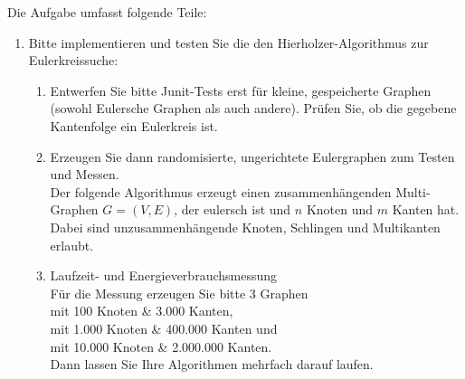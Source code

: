 \documentclass{article}
\begin{document}
		
Die Aufgabe umfasst folgende Teile:
			\begin{enumerate}
				\item Bitte implementieren und testen  Sie die den Hierholzer-Algorithmus zur Eulerkreissuche: 
				   \begin{enumerate}
								\item Entwerfen Sie bitte Junit-Tests erst für kleine, gespeicherte Graphen
								   (sowohl Eulersche Graphen als auch andere). 
									 Prüfen  Sie, ob die gegebene Kantenfolge ein Eulerkreis ist.							
								\item Erzeugen Sie dann randomisierte, ungerichtete  Eulergraphen zum Testen und Messen.\\
												
			Der folgende Algorithmus erzeugt einen zusammenhängenden Multi-Graphen $G=(V,E)$, der eulersch ist und $n$ Knoten und $m$ Kanten hat. Dabei sind unzusammenhängende Knoten, Schlingen und Multikanten erlaubt.\\[3mm]

							
\newpage

       \item Laufzeit- und Energieverbrauchsmessung\\
			    Für die Messung erzeugen Sie bitte  3  Graphen\\ \hspace*{1cm} 
					mit 100 Knoten \& 3.000 Kanten, \\  \hspace*{1cm} 
					mit 1.000 Knoten \& 400.000 Kanten und \\ \hspace*{1cm} 
					mit 10.000  Knoten \& 2.000.000 Kanten.\\
					Dann lassen Sie Ihre Algorithmen mehrfach darauf laufen.\\
					

\end{enumerate}
\end{enumerate}
\end{document}
